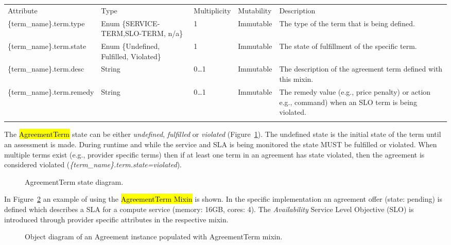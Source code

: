 \documentclass[10pt,a4paper]{article}
\begin{document}
{
	\begin{tabular}{lp{2.5cm}p{1cm}lp{6cm}}
	\toprule
	Attribute&Type&Multi\-plicity&Mutability&Description\\
	\colrule
	\{term\_name\}.term.type & Enum \{SERVICE-TERM,SLO-TERM, n/a\} & 1 & Immutable & The type of the term that is being defined.\\
	\{term\_name\}.term.state & Enum \{Undefined, Fulfilled, Violated\} & 1 & Immutable & The state of fulfillment of the specific term. \\
	\{term\_name\}.term.desc & String & 0\ldots1 & Immutable & The description of the agreement term defined with this mixin. \\
	\{term\_name\}.term.remedy & String & 0\ldots1 & Immutable & The remedy value (e.g., price penalty) or action e.g., command) when an SLO term is being violated. \\
	\botrule
	\end{tabular}
}



The \hl{AgreementTerm} state can be either \textit{undefined}, \textit{fulfilled} or \textit{violated} (Figure~\ref{fig:terms-states}). The undefined state is the initial state of the term until an assessment is made. During runtime and while the service and SLA is being monitored the state MUST be fulfilled or violated. When multiple terms exist (e.g., provider specific terms) then if at least one term in an agreement has state violated, then the agreement is considered violated (\textit{\{term\_name\}.term.state=violated}).

\begin{figure}[!h]
	{\centering {} \par}
	\caption{AgreementTerm state diagram.}
	\label{fig:terms-states}
\end{figure}

In Figure~\ref{fig:terms-example} an example of using the \hl{AgreementTerm Mixin} is shown. In the specific implementation an agreement offer (state: pending) is defined which describes a SLA for a compute service (memory: 16GB, cores: 4). The \textit{Availability} Service Level Objective (SLO) is introduced through provider specific attributes in the respective mixin.

\begin{figure}[!h]
	{\centering {} \par}
	\caption{Object diagram of an Agreement instance populated with AgreementTerm mixin.}
	\label{fig:terms-example}
\end{figure}
\end{document}

